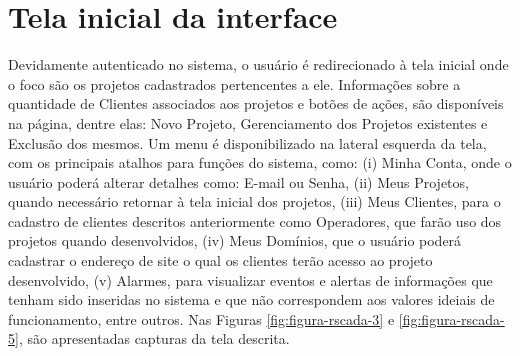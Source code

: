 \section{Tela inicial da interface}
\label{sec:tela-inicial}
Devidamente autenticado no sistema, o usuário é redirecionado à tela inicial onde o foco são os projetos cadastrados pertencentes a ele. Informações sobre a quantidade de Clientes associados aos projetos e botões de ações, são disponíveis na página, dentre elas: Novo Projeto, Gerenciamento dos Projetos existentes e Exclusão dos mesmos. Um menu é disponibilizado na lateral esquerda da tela, com os principais atalhos para funções do sistema, como: (i) Minha Conta, onde o usuário poderá alterar detalhes como: E-mail ou Senha, (ii) Meus Projetos, quando necessário retornar à tela inicial dos projetos, (iii) Meus Clientes, para o cadastro de clientes descritos anteriormente como Operadores, que farão uso dos projetos quando desenvolvidos, (iv) Meus Domínios, que o usuário poderá cadastrar o endereço de site o qual os clientes terão acesso ao projeto desenvolvido, (v) Alarmes, para visualizar eventos e alertas de informações que tenham sido inseridas no sistema e que não correspondem aos valores ideiais de funcionamento, entre outros. Nas Figuras \ref{fig:figura-rscada-3} e \ref{fig:figura-rscada-5}, são apresentadas capturas da tela descrita.

        \begin{figure}[!h]
    	\end{figure}
    	
    	\begin{figure}[!h]
    	\end{figure}

